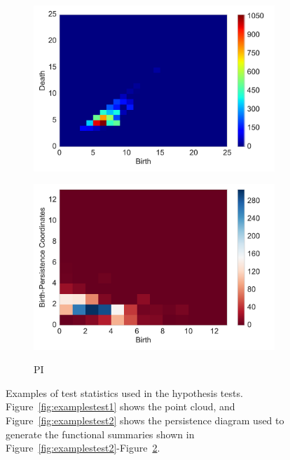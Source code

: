 \documentclass[12pt]{article}
\newcommand{\figref}[1]{Figure~\ref{#1}}
\begin{document}
\begin{figure}[htbp]
\begin{subfigure}{.24\textwidth}
        \includegraphics[width=\linewidth]{figure_5_intensity_fun.pdf}
    \label{fig:examplestest7}
  \end{subfigure}
    \begin{subfigure}{.24\textwidth}
    \centering
        \caption{PI}  
        \includegraphics[width=\linewidth]{figure_5_pimage_fun.pdf}
    \label{fig:examplestest8}
  \end{subfigure}
   \caption{Examples of test statistics used in the hypothesis tests. \figref{fig:examplestest1} shows the point cloud, and \figref{fig:examplestest2} shows the persistence diagram used to generate the functional summaries shown in \figref{fig:examplestest2}-\figref{fig:examplestest8}.}
   \label{fig:examples}
\end{figure}

\end{document}
